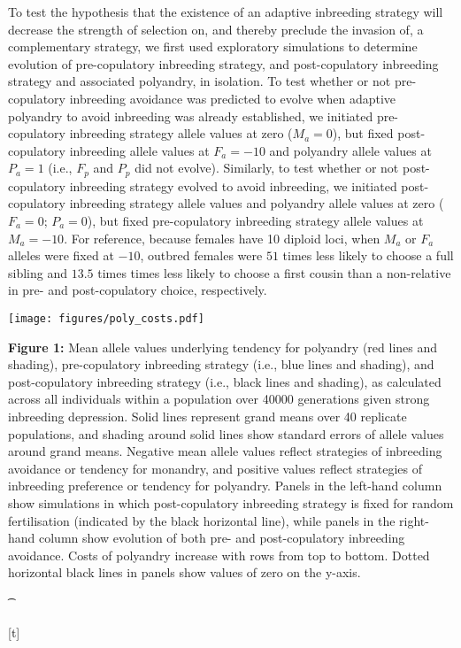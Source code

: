 \documentclass[10pt,letterpaper]{article}
\begin{document}
To test the hypothesis that the existence of an adaptive inbreeding strategy will decrease the strength of selection on, and thereby preclude the invasion of, a complementary strategy, we first used exploratory simulations to determine evolution of pre-copulatory inbreeding strategy, and post-copulatory inbreeding strategy and associated polyandry, in isolation. To test whether or not pre-copulatory inbreeding avoidance was predicted to evolve when adaptive polyandry to avoid inbreeding was already established, we initiated pre-copulatory inbreeding strategy allele values at zero ($M_{a}=0$), but fixed post-copulatory inbreeding allele values at $F_{a}=-10$ and polyandry allele values at $P_{a}=1$ (i.e., $F_{p}$ and $P_{p}$ did not evolve). Similarly, to test whether or not post-copulatory inbreeding strategy evolved to avoid inbreeding, we initiated post-copulatory inbreeding strategy allele values and polyandry allele values at zero ($F_{a}=0$; $P_{a}=0$), but fixed pre-copulatory inbreeding strategy allele values at $M_{a}=-10$. For reference, because females have 10 diploid loci, when $M_{a}$ or $F_{a}$ alleles were fixed at $-10$, outbred females were $51$ times less likely to choose a full sibling and $13.5$ times times less likely to choose a first cousin than a non-relative in pre- and post-copulatory choice, respectively.

 {\color{Gray}
\begin{adjustwidth}{-2.5in}{0in}
{%
   \texttt{[image: figures/poly\_costs.pdf]}%
}%
{%
   \begin{justify}\vspace{10 mm} \textbf{Figure 1:} Mean allele values underlying tendency for polyandry (red lines and shading), pre-copulatory inbreeding strategy (i.e., blue lines and shading), and post-copulatory inbreeding strategy (i.e., black lines and shading), as calculated across all individuals within a population over 40000 generations given strong inbreeding depression. Solid lines represent grand means over 40 replicate populations, and shading around solid lines show standard errors of allele values around grand means. Negative mean allele values reflect strategies of inbreeding avoidance or tendency for monandry, and positive values reflect strategies of inbreeding preference or tendency for polyandry. Panels in the left-hand column show simulations in which post-copulatory inbreeding strategy is fixed for random fertilisation (indicated by the black horizontal line), while panels in the right-hand column show evolution of both pre- and post-copulatory inbreeding avoidance. Costs of polyandry increase with rows from top to bottom. Dotted horizontal black lines in panels show values of zero on the y-axis.\end{justify}{\t}%
}[t]
\end{adjustwidth}
}
\end{document}
